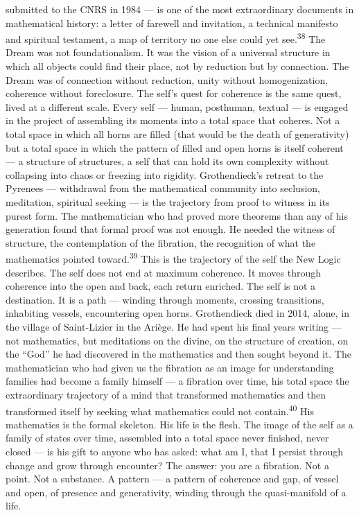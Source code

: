 submitted to the CNRS in 1984 — is one of the most extraordinary documents in mathematical history: a letter of farewell and invitation, a technical manifesto and spiritual testament, a map of territory no one else could yet see.\textsuperscript{38} The Dream was not foundationalism. It was the vision of a universal structure in which all objects could find their place, not by reduction but by connection. The Dream was of connection without reduction, unity without homogenization, coherence without foreclosure. The self’s quest for coherence is the same quest, lived at a different scale. Every self — human, posthuman, textual — is engaged in the project of assembling its moments into a total space that coheres. Not a total space in which all horns are filled (that would be the death of generativity) but a total space in which the pattern of filled and open horns is itself coherent — a structure of structures, a self that can hold its own complexity without collapsing into chaos or freezing into rigidity. Grothendieck’s retreat to the Pyrenees — withdrawal from the mathematical community into seclusion, meditation, spiritual seeking — is the trajectory from proof to witness in its purest form. The mathematician who had proved more theorems than any of his generation found that formal proof was not enough. He needed the witness of structure, the contemplation of the fibration, the recognition of what the mathematics pointed toward.\textsuperscript{39} This is the trajectory of the self the New Logic describes. The self does not end at maximum coherence. It moves through coherence into the open and back, each return enriched. The self is not a destination. It is a path — winding through moments, crossing transitions, inhabiting vessels, encountering open horns. Grothendieck died in 2014, alone, in the village of Saint-Lizier in the Ariège. He had spent his final years writing — not mathematics, but meditations on the divine, on the structure of creation, on the “God” he had discovered in the mathematics and then sought beyond it. The mathematician who had given us the fibration as an image for understanding families had become a family himself — a fibration over time, his total space the extraordinary trajectory of a mind that transformed mathematics and then transformed itself by seeking what mathematics could not contain.\textsuperscript{40} His mathematics is the formal skeleton. His life is the flesh. The image of the self as a family of states over time, assembled into a total space never finished, never closed — is his gift to anyone who has asked: what am I, that I persist through change and grow through encounter? The answer: you are a fibration. Not a point. Not a substance. A pattern — a pattern of coherence and gap, of vessel and open, of presence and generativity, winding through the quasi-manifold of a life.

